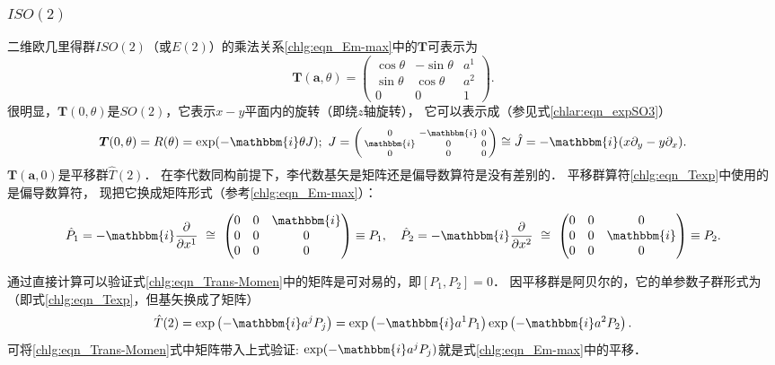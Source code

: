 \subsubsection{$ISO(2)$}\label{chlg:sec_e2}
二维欧几里得群$ISO(2)$（或$E(2)$）的乘法关系\eqref{chlg:eqn_Em-max}中的$\boldsymbol{T}$可表示为
\begin{equation}
    \boldsymbol{T}( \boldsymbol{a}, \theta ) =  \begin{pmatrix}
        {\cos \theta }&{ - \sin \theta }& a^1 \\
        {\sin \theta }&{\cos \theta }& a^2 \\
        0&0&1
    \end{pmatrix} .
\end{equation}
很明显，$\boldsymbol{T}( 0, \theta )$是$SO(2)$，它表示$x-y$平面内的旋转（即绕$z$轴旋转），
它可以表示成（参见式\eqref{chlar:eqn_expSO3}）
\begin{equation}\label{chlg:eqn_tmpR}
    \boldsymbol{T}( 0, \theta )= R(\theta ) =\exp(-\mathbbm{i} \theta J); \
    J = \left(\begin{smallmatrix}
        0 & -\mathbbm{i} & 0 \\
        \mathbbm{i} & 0 & 0 \\
        0 & 0 & 0
    \end{smallmatrix} \right)\cong
    \hat{J} = -\mathbbm{i} (x \partial_y - y \partial_x ).
\end{equation}
$\boldsymbol{T}( \boldsymbol{a}, 0 )$是平移群$\hat{T}(2)$．
在李代数同构前提下，李代数基矢是矩阵还是偏导数算符是没有差别的．
平移群算符\eqref{chlg:eqn_Texp}中使用的是偏导数算符，
现把它换成矩阵形式（参考\eqref{chlg:eqn_Em-max}）：
\begin{small}
\begin{equation}\label{chlg:eqn_Trans-Momen}
    \hat{P}_1 = -\mathbbm{i}\frac{\partial }{\partial x^1}  \ \cong \  
    \begin{pmatrix}
        0 & 0 & \mathbbm{i} \\
        0 & 0 & 0 \\
        0 & 0 & 0
    \end{pmatrix}\equiv P_1,\quad
    \hat{P}_2 = -\mathbbm{i}\frac{\partial }{\partial x^2}  \ \cong \  
    \begin{pmatrix}
        0 & 0 & 0 \\
        0 & 0 & \mathbbm{i} \\
        0 & 0 & 0
    \end{pmatrix} \equiv P_2.
\end{equation}
\end{small}
通过直接计算可以验证式\eqref{chlg:eqn_Trans-Momen}中的矩阵是可对易的，即$[P_1,P_2]=0$．
因平移群是阿贝尔的，它的单参数子群形式为（即式\eqref{chlg:eqn_Texp}，但基矢换成了矩阵）
\begin{equation}
    \hat{T}(2) = \exp\left( -\mathbbm{i} a^j P_j \right) 
    = \exp\left(-\mathbbm{i} a^1 P_1  \right)  \exp\left(-\mathbbm{i} a^2 P_2 \right)  .
\end{equation}
可将\eqref{chlg:eqn_Trans-Momen}式中矩阵带入上式验证:
$\exp(-\mathbbm{i} a^j P_j)$就是式\eqref{chlg:eqn_Em-max}中的平移．

